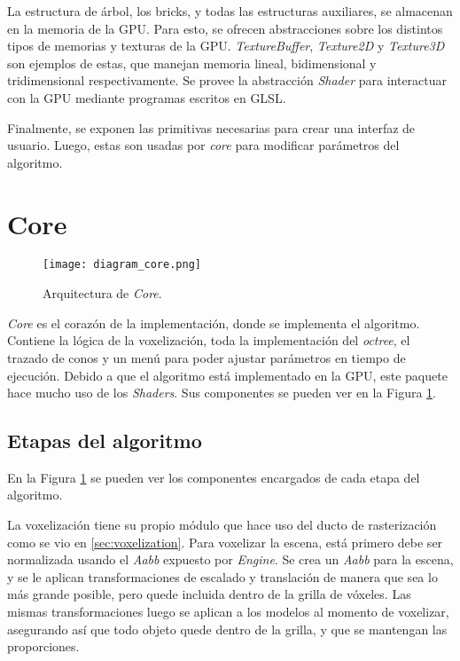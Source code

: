La estructura de árbol, los bricks, y todas las estructuras auxiliares, se almacenan en la memoria de la GPU.
Para esto, se ofrecen abstracciones sobre los distintos tipos de memorias y texturas de la GPU.
\textit{TextureBuffer}, \textit{Texture2D} y \textit{Texture3D} son ejemplos de estas, que manejan memoria lineal, bidimensional y tridimensional respectivamente.
Se provee la abstracción \textit{Shader} para interactuar con la GPU mediante programas escritos en GLSL.

Finalmente, se exponen las primitivas necesarias para crear una interfaz de usuario.
Luego, estas son usadas por \textit{core} para modificar parámetros del algoritmo.

\section{Core}

\begin{figure}[ht]
    \centering
    \texttt{[image: diagram\_core.png]}
    \caption{Arquitectura de \textit{Core}.}
    \label{fig:core_architecture}
\end{figure}

\textit{Core} es el corazón de la implementación, donde se implementa el algoritmo.
Contiene la lógica de la voxelización, toda la implementación del \textit{octree}, el trazado de conos y un menú para poder ajustar parámetros en tiempo de ejecución.
Debido a que el algoritmo está implementado en la GPU, este paquete hace mucho uso de los \textit{Shaders}.
Sus componentes se pueden ver en la Figura \ref{fig:core_architecture}.

\subsection{Etapas del algoritmo}

En la Figura \ref{fig:core_architecture} se pueden ver los componentes encargados de cada etapa del algoritmo.

La voxelización tiene su propio módulo que hace uso del ducto de rasterización como se vio en \ref{sec:voxelization}.
Para voxelizar la escena, está primero debe ser normalizada usando el \textit{Aabb} expuesto por \textit{Engine}.
Se crea un \textit{Aabb} para la escena, y se le aplican transformaciones de escalado y translación de manera que sea lo más grande posible, pero quede incluida dentro de la grilla de vóxeles.
Las mismas transformaciones luego se aplican a los modelos al momento de voxelizar, asegurando así que todo objeto quede dentro de la grilla, y que se mantengan las proporciones.

